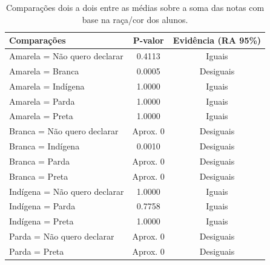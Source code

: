 \begin{table}[htb]
    \centering
\caption{Comparações dois a dois entre as médias sobre a soma das notas
        com base na raça/cor dos alunos.}
    \begin{tabular}{lcc}
    \toprule
    Comparações & P-valor & Evidência (RA 95\%)\\
    \midrule \midrule
    Amarela = Não quero declarar & 0.4113 & Iguais\\
    Amarela = Branca & 0.0005 & Desiguais\\
    Amarela = Indígena & 1.0000 & Iguais\\
    Amarela = Parda & 1.0000 & Iguais\\
    Amarela = Preta & 1.0000 & Iguais\\
    Branca = Não quero declarar & Aprox. 0 & Desiguais\\
    Branca = Indígena & 0.0010 & Desiguais\\
    Branca = Parda & Aprox. 0 & Desiguais\\
    Branca = Preta & Aprox. 0 & Desiguais\\
    Indígena = Não quero declarar & 1.0000 & Iguais\\
    Indígena = Parda & 0.7758 & Iguais\\
    Indígena = Preta & 1.0000  & Iguais\\
    Parda = Não quero declarar & Aprox. 0 & Desiguais\\
    Parda = Preta & Aprox. 0 & Desiguais\\
    \bottomrule
    \end{tabular}
    \centering
    
\end{table}
\clearpage

